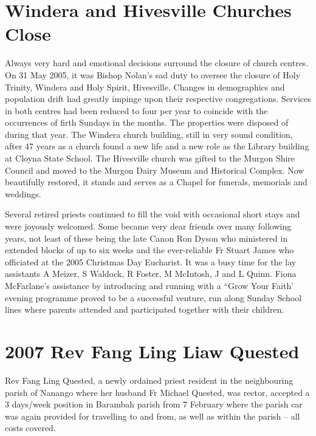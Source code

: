 \section{Windera and Hivesville Churches Close}



Always very hard and emotional decisions surround the closure of church centres. On 31 May 2005, it was Bishop Nolan's sad duty to oversee the closure of Holy Trinity, Windera and Holy Spirit, Hivesville. Changes in demographics and population drift had greatly impinge upon their respective congregations. Services in both centres had been reduced to four per year to coincide with the occurrences of firth Sundays in the months. The properties were disposed of during that year. The Windera church building, still in very sound condition, after 47 years as a church found a new life and a new role as the Library building at Cloyna State School. The Hivesville church was gifted to the Murgon Shire Council and moved to the Murgon Dairy Museum and Historical Complex. Now beautifully restored, it stands and serves as a Chapel for funerals, memorials and weddings.



Several retired priests continued to fill the void with occasional short stays and were joyously welcomed. Some became very dear friends over many following years, not least of these being the late Canon Ron Dyson who ministered in extended blocks of up to six weeks and the ever-reliable Fr Stuart James who officiated at the 2005 Christmas Day Eucharist. It was a busy time for the lay assistants A Meizer, S Waldock, R Foster, M McIntosh, J and L Quinn. Fiona McFarlane's assistance by introducing and running with a ``Grow Your Faith' evening programme proved to be a successful venture, run along Sunday School lines where parents attended and participated together with their children.



\section{2007 Rev Fang Ling Liaw Quested}



Rev Fang Ling Quested, a newly ordained priest resident in the neighbouring parish of Nanango where her husband Fr Michael Quested, was rector, accepted a 3 days/week position in Barambah parish from 7 February where the parish car was again provided for travelling to and from, as well as within the parish -- all costs covered.



